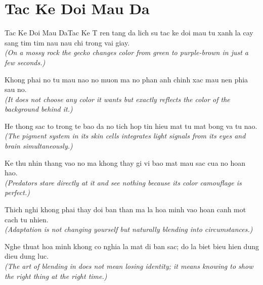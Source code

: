 \section{Tac Ke Doi Mau Da}
\begin{truyen}{Tac Ke Doi Mau Da}{Tac Ke}
T ren tang da lich su tac ke doi mau tu xanh la cay sang tim tim nau nau chi trong vai giay.\\
\textit{(On a mossy rock the gecko changes color from green to purple-brown in just a few seconds.)}

Khong phai no tu mau nao no muon ma no phan anh chinh xac mau nen phia sau no.\\
\textit{(It does not choose any color it wants but exactly reflects the color of the background behind it.)}

He thong sac to trong te bao da no tich hop tin hieu mat tu mat bong va tu nao.\\
\textit{(The pigment system in its skin cells integrates light signals from its eyes and brain simultaneously.)}

Ke thu nhin thang vao no ma khong thay gi vi bao mat mau sac cua no hoan hao.\\
\textit{(Predators stare directly at it and see nothing because its color camouflage is perfect.)}

Thich nghi khong phai thay doi ban than ma la hoa minh vao hoan canh mot cach tu nhien.\\
\textit{(Adaptation is not changing yourself but naturally blending into circumstances.)}

\end{truyen}
\begin{baihoc}
  Nghe thuat hoa minh khong co nghia la mat di ban sac; do la biet bieu hien dung dieu dung luc.\\
  \textit{(The art of blending in does not mean losing identity; it means knowing to show the right thing at the right time.)}
\end{baihoc}


